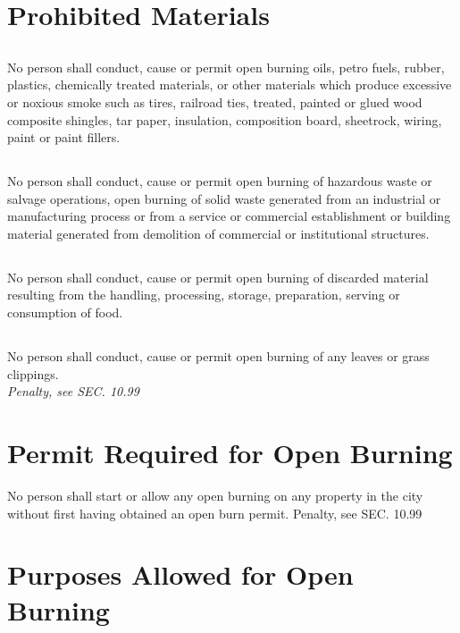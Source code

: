 \documentclass[code.tex]{subfiles}
\begin{document}
\section{Prohibited Materials}
\subsection{}
No person shall conduct, cause or permit open burning oils, petro fuels, rubber, plastics, chemically treated materials, or other materials which produce excessive or noxious smoke such as tires, railroad ties, treated, painted or glued wood composite shingles, tar paper, insulation, composition board, sheetrock, wiring, paint or paint fillers.
\subsection{}
No person shall conduct, cause or permit open burning of hazardous waste or salvage operations, open burning of solid waste generated from an industrial or manufacturing process or from a service or commercial establishment or building material generated from demolition of commercial or institutional structures.
\subsection{}
No person shall conduct, cause or permit open burning of discarded material resulting from the handling, processing, storage, preparation, serving or consumption of food.
\subsection{}
No person shall conduct, cause or permit open burning of any leaves or grass clippings.\\
\emph{Penalty, see SEC. 10.99}
\section{Permit Required for Open Burning}
No person shall start or allow any open burning on any property in the city without first having obtained an open burn permit.
Penalty, see SEC. 10.99
\section{Purposes Allowed for Open Burning}
\end{document}
